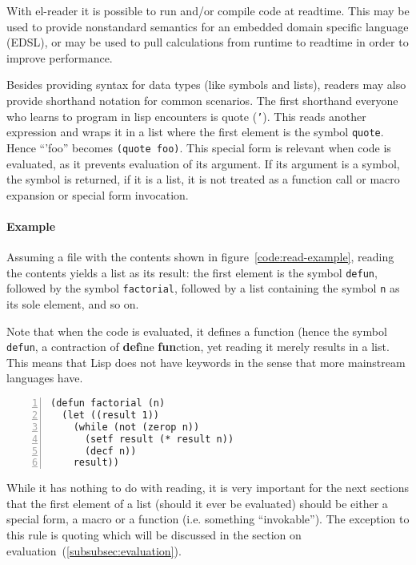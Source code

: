 \documentclass[a4paper,10pt,twoside]{report}
\newcommand{\elr}{el-reader}
\newcommand{\sym}[1]{\texttt{#1}}
\newcommand{\fun}[1]{\texttt{#1}}
\begin{document}
With \elr{} it is possible to run and/or compile code at readtime.  This may be
used to provide nonstandard semantics for an embedded domain specific language
(EDSL), or may be used to pull calculations from runtime to readtime in order to
improve performance.

Besides providing syntax for data types (like symbols and lists), readers may
also provide shorthand notation for common scenarios.  The first shorthand
everyone who learns to program in lisp encounters is quote (\sym{'}).  This
reads another expression and wraps it in a list where the first element is the
symbol \sym{quote}.  Hence ``'foo'' becomes \texttt{(quote foo)}.  This special
form is relevant when code is evaluated, as it prevents evaluation of its
argument.  If its argument is a symbol, the symbol is returned, if it is a list,
it is not treated as a function call or macro expansion or special form
invocation.

\paragraph{Example}
\label{par:read-example}

Assuming a file with the contents shown in figure~\ref{code:read-example},
reading the contents yields a list as its result: the first element is the
symbol \fun{defun}, followed by the symbol \sym{factorial}, followed by a list
containing the symbol \sym{n} as its sole element, and so on.

Note that when the code is evaluated, it defines a function (hence the symbol
\sym{defun}, a contraction of \textbf{def}ine \textbf{fun}ction, yet reading it
merely results in a list.  This means that Lisp does not have keywords in the
sense that more mainstream languages have.

\begin{lstlisting}[style=lispcode,label={code:read-example},caption={A function
which calculates the factorial of its argument.},numbers=left]
(defun factorial (n)
  (let ((result 1))
    (while (not (zerop n))
      (setf result (* result n))
      (decf n))
    result))
\end{lstlisting}

While it has nothing to do with reading, it is very important for the next
sections that the first element of a list (should it ever be evaluated) should
be either a special form, a macro or a function (i.e. something ``invokable'').
The exception to this rule is quoting which will be discussed in the section on
evaluation~(\ref{subsubsec:evaluation}).
\end{document}
